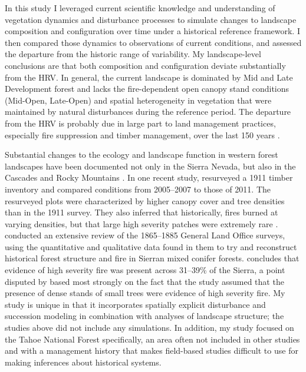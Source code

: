 

In this study I leveraged current scientific knowledge and understanding of vegetation dynamics and disturbance processes to simulate changes to landscape composition and configuration over time under a historical reference framework. I then compared those dynamics to observations of current conditions, and assessed the departure from the historic range of variability. My landscape-level conclusions are that both composition and configuration deviate substantially from the HRV. In general, the current landscape is dominated by Mid and Late Development forest and lacks the fire-dependent open canopy stand conditions (Mid-Open, Late-Open) and spatial heterogeneity in vegetation that were maintained by natural disturbances during the reference period. The departure from the HRV is probably due in large part to land management practices, especially fire suppression and timber management, over the last 150 years \citep{Safford2014,Stephens2007}. 

Substantial changes to the ecology and landscape function in western forest landscapes have been documented not only in the Sierra Nevada, but also in the Cascades and Rocky Mountains \citep{Hessburg2005,Baker2012,Baker2014,Mallek2013,Agee1993}. In one recent study, \citet{Collins2011} resurveyed a 1911 timber inventory and compared conditions from 2005--2007 to those of 2011. The resurveyed plots were characterized by higher canopy cover and tree densities than in the 1911 survey. They also inferred that historically, fires burned at varying densities, but that large high severity patches were extremely rare \citep{Collins2011}. \citet{Baker2014} conducted an extensive review of the 1865--1885 General Land Office surveys, using the quantitative and qualitative data found in them to try and reconstruct historical forest structure and fire in Sierran mixed conifer forests. \citet{Baker2014} concludes that evidence of high severity fire was present across 31--39\% of the Sierra, a point disputed by \citet{Fule2014} based most strongly on the fact that the \citet{Baker2014} study assumed that the presence of dense stands of small trees were evidence of high severity fire. My study is unique in that it incorporates spatially explicit disturbance and succession modeling in combination with analyses of landscape structure; the studies above did not include any simulations. In addition, my study focused on the Tahoe National Forest specifically, an area often not included in other studies and with a management history that makes field-based studies difficult to use for making inferences about historical systems.

